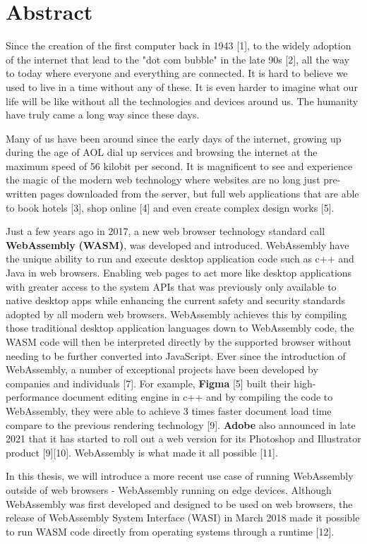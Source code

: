 \chapter*{Abstract}

Since the creation of the first computer back in 1943 [1], to the widely adoption of the internet that lead to the "dot com bubble" in the late 90s [2], all the way to today where everyone and everything are connected. It is hard to believe we used to live in a time without any of these. It is even harder to imagine what our life will be like without all the technologies and devices around us. The humanity have truly came a long way since these days.

Many of us have been around since the early days of the internet, growing up during the age of AOL dial up services and browsing the internet at the maximum speed of 56 kilobit per second. It is magnificent to see and experience the magic of the modern web technology where websites are no long just pre-written pages downloaded from the server, but full web applications that are able to book hotels [3], shop online [4] and even create complex design works [5].

Just a few years ago in 2017, a new web browser technology standard call \textbf{WebAssembly} \textbf{(WASM)}, was developed and introduced. WebAssembly have the unique ability to run and execute desktop application code such as c++ and Java in web browsers. Enabling web pages to act more like desktop applications with greater access to the system APIs that was previously only available to native desktop apps while enhancing the current safety and security standards adopted by all modern web browsers. WebAssembly achieves this by compiling those traditional desktop application languages down to WebAssembly code, the WASM code will then be interpreted directly by the supported browser without needing to be further converted into JavaScript. Ever since the introduction of WebAssembly, a number of exceptional projects have been developed by companies and individuals [7]. For example, \textbf{Figma} [5] built their high-performance document editing engine in c++ and by compiling the code to WebAssembly, they were able to achieve 3 times faster document load time compare to the previous rendering technology [9]. \textbf{Adobe} also announced in late 2021 that it has started to roll out a web version for its Photoshop and Illustrator product [9][10]. WebAssembly is what made it all possible [11].

In this thesis, we will introduce a more recent use case of running WebAssembly outside of web browsers - WebAssembly running on edge devices. Although WebAssembly was first developed and designed to be used on web browsers, the release of WebAssembly System Interface (WASI) in March 2018 made it possible to run WASM code directly from operating systems through a runtime [12].

